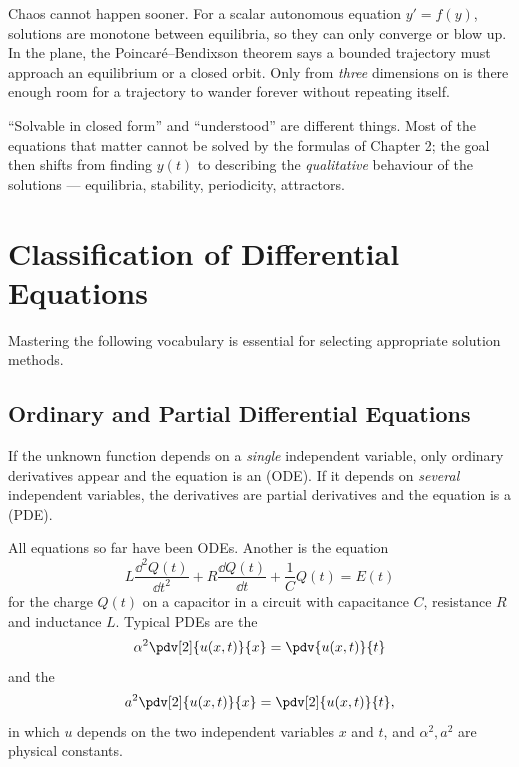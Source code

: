 \begin{remark}
	Chaos cannot happen sooner. For a scalar autonomous equation \(y' = f(y)\), solutions
	are monotone between equilibria, so they can only converge or blow up. In the plane,
	the Poincaré--Bendixson theorem says a bounded trajectory must approach an
	equilibrium or a closed orbit. Only from \emph{three} dimensions on is there enough
	room for a trajectory to wander forever without repeating itself.
\end{remark}

\begin{moral}
	``Solvable in closed form'' and ``understood'' are different things. Most of the
	equations that matter cannot be solved by the formulas of Chapter 2; the goal then
	shifts from finding \(y(t)\) to describing the \emph{qualitative} behaviour of the
	solutions --- equilibria, stability, periodicity, attractors.
\end{moral}

\section{Classification of Differential Equations}


Mastering the following vocabulary is essential for selecting appropriate solution
methods.

\subsection{Ordinary and Partial Differential Equations}

\begin{definition}
	If the unknown function depends on a \emph{single} independent variable, only ordinary
	derivatives appear and the equation is an 
	(ODE). If it depends on \emph{several} independent variables, the derivatives are
	partial derivatives and the equation is a  (PDE).
\end{definition}

\begin{eg}
	All equations so far have been ODEs. Another is the equation
	\[
		L\frac{\dd^2 Q(t)}{\dd t^2} + R \frac{\dd Q(t)}{\dd t} + \frac{1}{C} Q(t) = E(t)
	\]
	for the charge \(Q(t)\) on a capacitor in a circuit with capacitance \(C\),
	resistance \(R\) and inductance \(L\). Typical PDEs are the 
	\[
		\alpha^2 \pdv[2]{u(x,t)}{x} = \pdv{u(x,t)}{t}
	\]
	and the 
	\[
		a^2 \pdv[2]{u(x,t)}{x} = \pdv[2]{u(x,t)}{t},
	\]
	in which \(u\) depends on the two independent variables \(x\) and \(t\), and
	\(\alpha^2, a^2\) are physical constants.
\end{eg}


